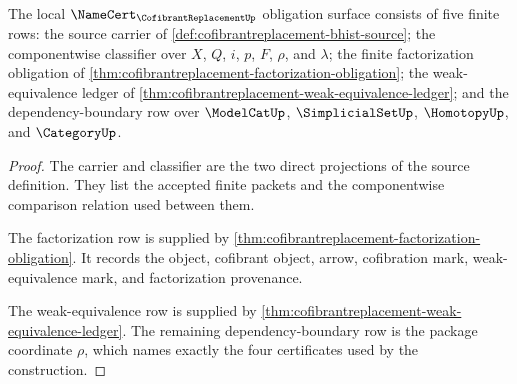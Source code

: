 \begin{theorem}
\label{thm:cofibrantreplacement-namecert-obligation-surface}
The local $\NameCert_{\CofibrantReplacementUp}$ obligation surface consists of five finite rows: the source carrier of \autoref{def:cofibrantreplacement-bhist-source}; the componentwise classifier over $X$, $Q$, $i$, $p$, $F$, $\rho$, and $\lambda$; the finite factorization obligation of \autoref{thm:cofibrantreplacement-factorization-obligation}; the weak-equivalence ledger of \autoref{thm:cofibrantreplacement-weak-equivalence-ledger}; and the dependency-boundary row over $\ModelCatUp$, $\SimplicialSetUp$, $\HomotopyUp$, and $\CategoryUp$.
\end{theorem}
\begin{proof}
The carrier and classifier are the two direct projections of the source definition. They list the accepted finite packets and the componentwise comparison relation used between them.

The factorization row is supplied by \autoref{thm:cofibrantreplacement-factorization-obligation}. It records the object, cofibrant object, arrow, cofibration mark, weak-equivalence mark, and factorization provenance.

The weak-equivalence row is supplied by \autoref{thm:cofibrantreplacement-weak-equivalence-ledger}. The remaining dependency-boundary row is the package coordinate $\rho$, which names exactly the four certificates used by the construction.
\end{proof}

